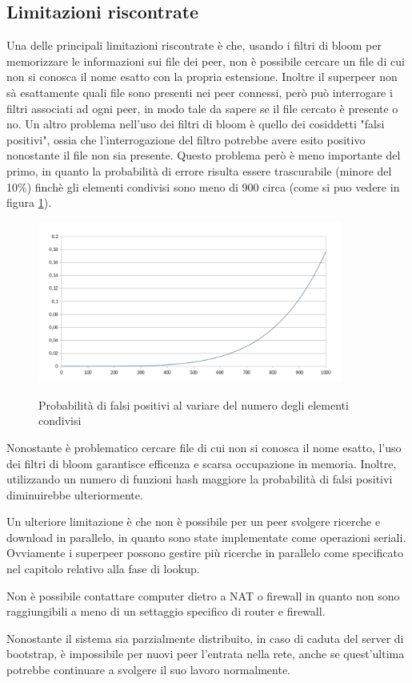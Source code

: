 \subsection{Limitazioni riscontrate}
Una delle principali limitazioni riscontrate è che, usando i filtri di bloom per memorizzare le informazioni sui file dei peer, non è possibile cercare un file di cui non si conosca il nome esatto con la propria estensione. Inoltre il superpeer non sà esattamente quali file sono presenti nei peer connessi, però può interrogare i filtri associati ad ogni peer, in modo tale da sapere se il file cercato è presente o no. \linebreak
Un altro problema nell'uso dei filtri di bloom è quello dei cosiddetti "falsi positivi", ossia che l'interrogazione del filtro potrebbe avere esito positivo nonostante il file non sia presente.
Questo problema però è meno importante del primo, in quanto la probabilità di errore risulta essere trascurabile (minore del 10\%) finchè gli elementi condivisi sono meno di 900 circa (come si puo vedere in figura \ref{falsi}).

\begin{figure}[h]
\centering
{\includegraphics[width=10cm]{img/falsi}}
\caption{Probabilità di falsi positivi al variare del numero degli elementi condivisi\label{falsi}}
\end{figure}

Nonostante è problematico cercare file di cui non si conosca il nome esatto, l'uso dei filtri di bloom garantisce efficenza e scarsa occupazione in memoria. Inoltre, utilizzando un numero di funzioni hash maggiore la probabilità di falsi positivi diminuirebbe ulteriormente.\linebreak

Un ulteriore limitazione è che non è possibile per un peer svolgere ricerche e download in parallelo, in quanto sono state implementate come operazioni seriali. Ovviamente i superpeer possono gestire più ricerche in parallelo come specificato nel capitolo relativo alla fase di lookup.\linebreak

Non è possibile contattare computer dietro a NAT o firewall in quanto non sono raggiungibili a meno di un settaggio specifico di router e firewall.\linebreak

Nonostante il sistema sia parzialmente distribuito, in caso di caduta del server di bootstrap, è impossibile per nuovi peer l'entrata nella rete, anche se quest'ultima potrebbe continuare a svolgere il suo lavoro normalmente.\linebreak

